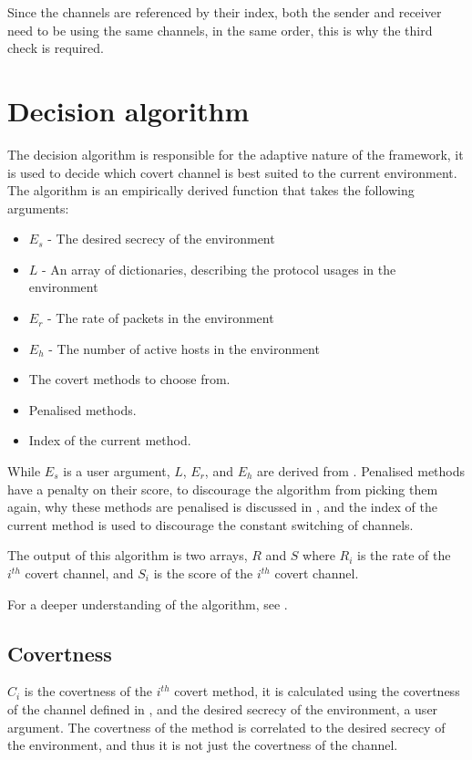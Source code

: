 Since the channels are referenced by their index, both the sender and receiver need to be using the same channels, in the same order, this is why the third check is required.

\section{Decision algorithm}
\label{sec:decision_algorithm}

The decision algorithm is responsible for the adaptive nature of the framework, it is used to decide which covert channel is best suited to the current environment.
The algorithm is an empirically derived function that takes the following arguments:

\begin{itemize}
    \item $E_s$ - The desired secrecy of the environment
    \item $L$ - An array of dictionaries, describing the protocol usages in the environment
    \item $E_r$ - The rate of packets in the environment
    \item $E_h$ - The number of active hosts in the environment
    \item The covert methods to choose from.
    \item Penalised methods.
    \item Index of the current method.
\end{itemize}

While $E_s$ is a user argument, $L$, $E_r$, and $E_h$ are derived from . Penalised methods have a penalty on their score, to discourage the algorithm from picking them again, why these methods are penalised is discussed in , and the index of the current method is used to discourage the constant switching of channels.

The output of this algorithm is two arrays, $R$ and $S$ where $R_i$ is the rate of the $i^{th}$ covert channel, and $S_i$ is the score of the $i^{th}$ covert channel.

For a deeper understanding of the algorithm, see .

\subsection{Covertness}

$C_i$ is the covertness of the $i^{th}$ covert method, it is calculated using the covertness of the channel defined in , and the desired secrecy of the environment, a user argument. The covertness of the method is correlated to the desired secrecy of the environment, and thus it is not just the covertness of the channel.

